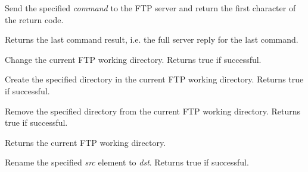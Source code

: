 
Send the specified {\it command} to the FTP server and return the first
character of the return code.


\label{wxftpgetlastresult}


Returns the last command result, i.e. the full server reply for the last
command.



\label{wxftpchdir}


Change the current FTP working directory.
Returns true if successful.


\label{wxftpmkdir}


Create the specified directory in the current FTP working directory.
Returns true if successful.


\label{wxftprmdir}


Remove the specified directory from the current FTP working directory.
Returns true if successful.


\label{wxftppwd}


Returns the current FTP working directory.



\label{wxftprename}


Rename the specified {\it src} element to {\it dst}. Returns true if successful.



\label{wxftprmfile}


